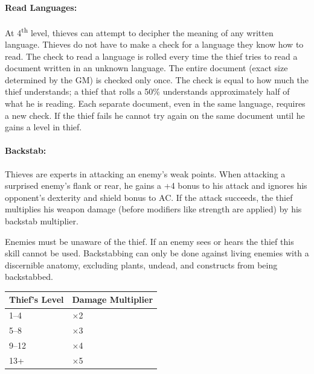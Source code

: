 \begin{multicols}{2}
\paragraph{Read Languages:} At 4\textsuperscript{th} level, thieves can attempt to decipher the meaning of any written language.  Thieves do not have to make a check for a language they know how to read. The check to read a language is rolled every time the thief tries to read a document written in an unknown language.  The entire document (exact size determined by the GM) is checked only once. The check is equal to how much the thief understands; a thief that rolls a 50\% understands approximately half of what he is reading.  Each separate document, even in the same language, requires a new check.  If the thief fails he cannot try again on the same document until he gains a level in thief.

\paragraph{Backstab:} Thieves are experts in attacking an enemy's weak points.  When attacking a surprised enemy's flank or rear, he gains a +4 bonus to his attack and ignores his opponent's dexterity and shield bonus to AC.  If the attack succeeds, the thief multiplies his weapon damage (before modifiers like strength are applied) by his backstab multiplier.

Enemies must be unaware of the thief.  If an enemy sees or hears the thief this skill cannot be used.  Backstabbing can only be done against living enemies with a discernible anatomy, excluding plants, undead, and constructs from being backstabbed. 

\noindent
\begin{minipage}{\columnwidth}

\label{backstab}
\noindent
\begin{tabular}{|m{}|m{}|}
\hline
Thief's Level	& Damage Multiplier \\
\hline\hline
\rowcolor[gray]{.9}1--4		& $\times$2 \\
5--8		& $\times$3 \\
\rowcolor[gray]{.9}9--12	& $\times$4 \\
13+		& $\times$5 \\
\hline
\end{tabular}

\end{minipage}


\end{multicols}
